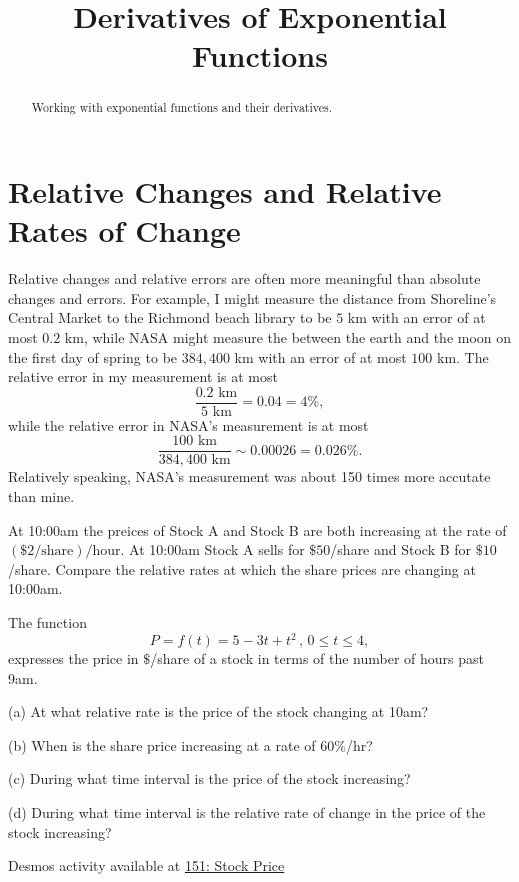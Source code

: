 \documentclass{ximera}
\title{Derivatives of Exponential Functions}
\begin{document}
\begin{abstract}
Working with exponential functions and their derivatives.
\end{abstract}
\maketitle


\section*{Relative Changes and Relative Rates of Change}
Relative changes and relative errors are often more meaningful than absolute changes and errors. For example, I might measure the distance from Shoreline's Central Market to the Richmond beach library to be $5$ km with an  error of at most $0.2$ km, while NASA might measure the between the earth and the moon on the first day of spring to be $384,400$ km with an error of at most $100$ km. The relative error in my measurement is at most
\[
  \frac{0.2 \text{ km} }{5 \text{ km}} = 0.04 = 4\% ,
\] 
while the relative error in NASA's measurement is at most
\[ 
   \frac{100 \text{ km} }{384,400 \text{ km}} \sim 0.00026 = 0.026\% .
\]
Relatively speaking, NASA's measurement was about 150 times more accutate than mine.

\begin{question}  \label{Qfnljhn}
At 10:00am the preices of Stock A and Stock B are both increasing at the rate of $(\$2/\text{share})/\text{hour}$. At 10:00am Stock A sells for $\$50$/share and Stock B for $\$10$/share. Compare the relative rates at which the share prices are changing at 10:00am.
\end{question}


\begin{question} \label{Q43tbbtt}
The function 
\[
      P = f(t) = 5 -3t + t^2 \, , \, 0\leq t \leq 4 , 
\]
expresses the price in $\$$/share of a stock in terms of the number of hours past 9am.

(a) At what relative rate is the price of the stock changing at 10am? 

(b) When is the share price increasing at a rate of $60\%$/hr?

(c) During what time interval is the price of the stock increasing?

(d) During what time interval is the relative rate of change in the price of the stock increasing? 

\begin{onlineOnly}
    \begin{center}
\end{center}
\end{onlineOnly}

Desmos activity available at \href{https://www.desmos.com/calculator/hhkveu6lxp}{151: Stock Price}
\end{question}
\end{document}
